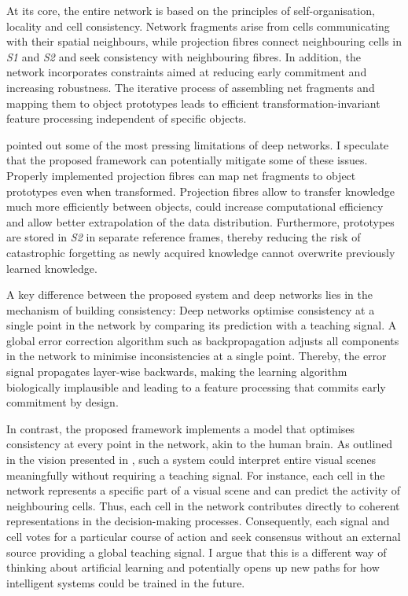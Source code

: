 At its core, the entire network is based on the principles of self-organisation, locality and cell consistency.
Network fragments arise from cells communicating with their spatial neighbours, while projection fibres connect neighbouring cells in \emph{S1} and \emph{S2} and seek consistency with neighbouring fibres.
In addition, the network incorporates constraints aimed at reducing early commitment and increasing robustness. The iterative process of assembling net fragments and mapping them to object prototypes leads to efficient transformation-invariant feature processing independent of specific objects.

 pointed out some of the most pressing limitations of deep networks.
I speculate that the proposed framework can potentially mitigate some of these issues. Properly implemented projection fibres can map net fragments to object prototypes even when transformed. Projection fibres allow to transfer knowledge much more efficiently between objects, could increase computational efficiency and allow better extrapolation of the data distribution. Furthermore, prototypes are stored in \emph{S2} in separate reference frames, thereby reducing the risk of catastrophic forgetting as newly acquired knowledge cannot overwrite previously learned knowledge.

A key difference between the proposed system and deep networks lies in the mechanism of building consistency:
Deep networks optimise consistency at a single point in the network by comparing its prediction with a teaching signal.
A global error correction algorithm such as backpropagation adjusts all components in the network to minimise inconsistencies at a single point.
Thereby, the error signal propagates layer-wise backwards, making the learning algorithm biologically implausible and leading to a feature processing that commits early commitment by design.

In contrast, the proposed framework implements a model that optimises consistency at every point in the network, akin to the human brain.
As outlined in the vision presented in , such a system could interpret entire visual scenes meaningfully without requiring a teaching signal.
For instance, each cell in the network represents a specific part of a visual scene and can predict the activity of neighbouring cells.
Thus, each cell in the network contributes directly to coherent representations in the decision-making processes. Consequently, each signal and cell votes for a particular course of action and seek consensus without an external source providing a global teaching signal.
I argue that this is a different way of thinking about artificial learning and potentially opens up new paths for how intelligent systems could be trained in the future.


